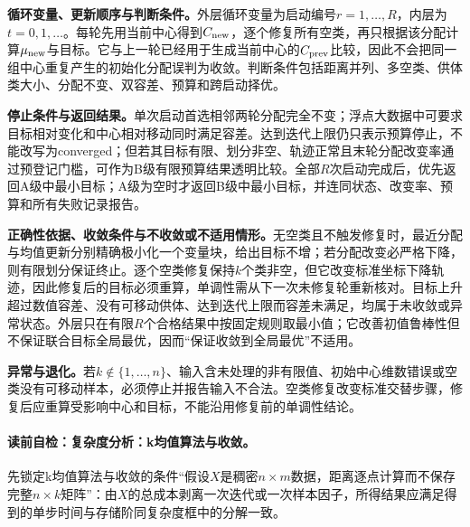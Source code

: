 \label{struct:V4-C02-CH23}
\textbf{循环变量、更新顺序与判断条件。}外层循环变量为启动编号$r=1,\ldots,R$，内层为$t=0,1,\ldots$。每轮先用当前中心得到$C_{\rm new}$，逐个修复所有空类，再只根据该分配计算$\mu_{\rm new}$与目标。它与上一轮已经用于生成当前中心的$C_{\rm prev}$比较，因此不会把同一组中心重复产生的初始化分配误判为收敛。判断条件包括距离并列、多空类、供体类大小、分配不变、双容差、预算和跨启动择优。

\label{struct:V4-C02-CH24}
\textbf{停止条件与返回结果。}单次启动首选相邻两轮分配完全不变；浮点大数据中可要求目标相对变化和中心相对移动同时满足容差。达到迭代上限仍只表示预算停止，不能改写为converged；但若其目标有限、划分非空、轨迹正常且末轮分配改变率通过预登记门槛，可作为B级有限预算结果透明比较。全部$R$次启动完成后，优先返回A级中最小目标；A级为空时才返回B级中最小目标，并连同状态、改变率、预算和所有失败记录报告。

\label{struct:V4-C02-CH25}
\textbf{正确性依据、收敛条件与不收敛或不适用情形。}无空类且不触发修复时，最近分配与均值更新分别精确极小化一个变量块，给出目标不增；若分配改变必严格下降，则有限划分保证终止。逐个空类修复保持$k$个类非空，但它改变标准坐标下降轨迹，因此修复后的目标必须重算，单调性需从下一次未修复轮重新核对。目标上升超过数值容差、没有可移动供体、达到迭代上限而容差未满足，均属于未收敛或异常状态。外层只在有限$R$个合格结果中按固定规则取最小值；它改善初值鲁棒性但不保证联合目标全局最优，因而“保证收敛到全局最优”不适用。

\begin{warningbox}
\textbf{异常与退化。}若$k\notin\{1,\ldots,n\}$、输入含未处理的非有限值、初始中心维数错误或空类没有可移动样本，必须停止并报告输入不合法。空类修复改变标准交替步骤，修复后应重算受影响中心和目标，不能沿用修复前的单调性结论。
\end{warningbox}

\label{struct:V4-C02-CH26}
\label{struct:V4-C02-CH27}
\paragraph{读前自检：复杂度分析：k均值算法与收敛。}先锁定k均值算法与收敛的条件“假设$X$是稠密$n\times m$数据，距离逐点计算而不保存完整$n\times k$矩阵”：由$X$的总成本剥离一次迭代或一次样本因子，所得结果应满足得到的单步时间与存储阶同复杂度框中的分解一致。\par


